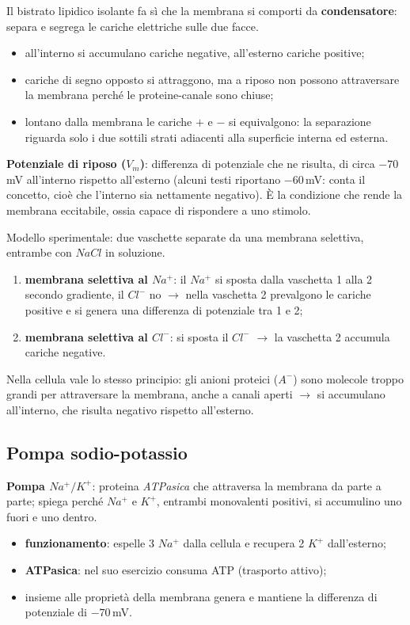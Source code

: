 Il bistrato lipidico isolante fa sì che la membrana si comporti da \textbf{condensatore}: separa e
segrega le cariche elettriche sulle due facce.
\begin{itemize}
  \item all'interno si accumulano cariche negative, all'esterno cariche positive;
  \item cariche di segno opposto si attraggono, ma a riposo non possono attraversare la membrana
    perché le proteine-canale sono chiuse;
  \item lontano dalla membrana le cariche $+$ e $-$ si equivalgono: la separazione riguarda solo i
    due sottili strati adiacenti alla superficie interna ed esterna.
\end{itemize}

\textbf{Potenziale di riposo ($V_m$)}: differenza di potenziale che ne risulta, di circa $-70$\,mV
all'interno rispetto all'esterno (alcuni testi riportano $-60$\,mV: conta il concetto, cioè che
l'interno sia nettamente negativo). È la condizione che rende la membrana eccitabile, ossia capace
di rispondere a uno stimolo.

Modello sperimentale: due vaschette separate da una membrana selettiva, entrambe con $NaCl$ in
soluzione.
\begin{enumerate}
  \item \textbf{membrana selettiva al $Na^+$}: il $Na^+$ si sposta dalla vaschetta 1 alla 2 secondo
    gradiente, il $Cl^-$ no $\rightarrow$ nella vaschetta 2 prevalgono le cariche positive e si
    genera una differenza di potenziale tra 1 e 2;
  \item \textbf{membrana selettiva al $Cl^-$}: si sposta il $Cl^-$ $\rightarrow$ la vaschetta 2
    accumula cariche negative.
\end{enumerate}
Nella cellula vale lo stesso principio: gli anioni proteici ($A^-$) sono molecole troppo grandi per
attraversare la membrana, anche a canali aperti $\rightarrow$ si accumulano all'interno, che risulta
negativo rispetto all'esterno.

\subsection{Pompa sodio-potassio}

\textbf{Pompa $Na^+/K^+$}: proteina \textit{ATPasica} che attraversa la membrana da parte a parte;
spiega perché $Na^+$ e $K^+$, entrambi monovalenti positivi, si accumulino uno fuori e uno dentro.
\begin{itemize}
  \item \textbf{funzionamento}: espelle 3 $Na^+$ dalla cellula e recupera 2 $K^+$ dall'esterno;
  \item \textbf{ATPasica}: nel suo esercizio consuma ATP (trasporto attivo);
  \item insieme alle proprietà della membrana genera e mantiene la differenza di potenziale di
    $-70$\,mV.
\end{itemize}

